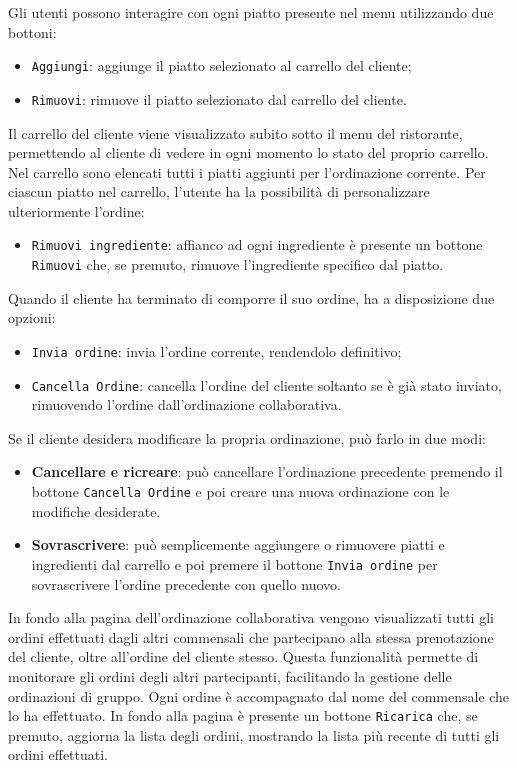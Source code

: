 Gli utenti possono interagire con ogni piatto presente nel menu utilizzando due bottoni:
\begin{itemize}
    \item \texttt{Aggiungi}: aggiunge il piatto selezionato al carrello del cliente;
    \item \texttt{Rimuovi}: rimuove il piatto selezionato dal carrello del cliente.
\end{itemize}

Il carrello del cliente viene visualizzato subito sotto il menu del ristorante, permettendo al cliente di vedere in ogni momento lo stato del proprio carrello. 
Nel carrello sono elencati tutti i piatti aggiunti per l'ordinazione corrente. Per ciascun piatto nel carrello, l'utente ha la possibilità di personalizzare ulteriormente 
l'ordine:
\begin{itemize}
    \item \texttt{Rimuovi ingrediente}: affianco ad ogni ingrediente è presente un bottone \texttt{Rimuovi} che, se premuto, rimuove l'ingrediente specifico dal piatto.
\end{itemize}

Quando il cliente ha terminato di comporre il suo ordine, ha a disposizione due opzioni:
\begin{itemize}
    \item \texttt{Invia ordine}: invia l'ordine corrente, rendendolo definitivo;
    \item \texttt{Cancella Ordine}: cancella l'ordine del cliente soltanto se è già stato inviato, rimuovendo l'ordine dall'ordinazione collaborativa.
\end{itemize}

Se il cliente desidera modificare la propria ordinazione, può farlo in due modi:
\begin{itemize}
    \item \textbf{Cancellare e ricreare}: può cancellare l'ordinazione precedente premendo il bottone \texttt{Cancella Ordine} e poi creare una nuova ordinazione 
	con le modifiche desiderate.
    \item \textbf{Sovrascrivere}: può semplicemente aggiungere o rimuovere piatti e ingredienti dal carrello e poi premere il bottone \texttt{Invia ordine} 
	per sovrascrivere l'ordine precedente con quello nuovo.
\end{itemize}


In fondo alla pagina dell'ordinazione collaborativa vengono visualizzati tutti gli ordini effettuati dagli altri commensali che partecipano alla stessa prenotazione 
del cliente, oltre all'ordine del cliente stesso. Questa funzionalità permette di monitorare gli ordini degli altri partecipanti, facilitando la gestione delle ordinazioni di gruppo. Ogni ordine è accompagnato dal nome del commensale che lo ha effettuato.
In fondo alla pagina è presente un bottone \texttt{Ricarica} che, se premuto, aggiorna la lista degli ordini, mostrando la lista più recente di tutti gli ordini effettuati.



